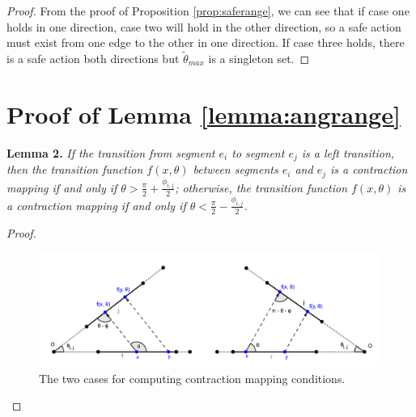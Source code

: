 \documentclass[]{styles/svproc}  %
\begin{document}
\begin{appendix}
\begin{proof}
From the proof of Proposition \ref{prop:saferange}, we can see that if case one
holds in one direction, case two will hold in the other direction, so a safe
action must exist from one edge to the other in one direction. If case three
holds, there is a safe action both directions but $\tilde{\theta}_{max}$ is a
singleton set.
\end{proof}
\section{Proof of Lemma \ref{lemma:angrange}}

\textbf{Lemma 2.} {\em
If the transition from segment $e_i$ to segment $e_j$ is a left transition, then the
transition function $f(x, \theta)$ between segments $e_i$ and $e_j$ is a contraction
mapping if and only if $\theta > \frac{\pi}{2}+\frac{\phi_{i, j}}{2}$;
otherwise, the transition function $f(x, \theta)$ is a contraction mapping if
and only if $\theta < \frac{\pi}{2}-\frac{\phi_{i, j}}{2}$.}

\begin{proof}

\begin{figure}
    \includegraphics[width=1\linewidth]{figures/contraction_map_cond.png}
    \centering
    \caption{The two cases for computing contraction mapping conditions. \label{fig:cont_map}}
    \centering
\end{figure}


\end{proof}
\end{appendix}
\end{document}
